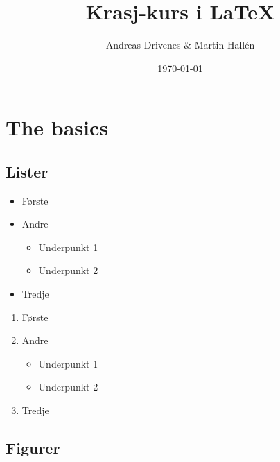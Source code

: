 \documentclass[a4paper]{article}
\begin{document}
\title{Krasj-kurs i \LaTeX}
\author{Andreas Drivenes \& Martin Hallén}
\date{\today}

\maketitle

\begin{abstract}
    \blindtext
\end{abstract}

\section{The basics}

\blindtext

\subsection{Lister}

\begin{itemize}
    \item Første
    \item Andre
    \begin{itemize}
        \item Underpunkt 1
        \item Underpunkt 2
    \end{itemize}
    \item Tredje
\end{itemize}

\begin{enumerate}
    \item Første
    \item Andre
    \begin{itemize}
        \item Underpunkt 1
        \item Underpunkt 2
    \end{itemize}
    \item Tredje
\end{enumerate}

\subsection{Figurer}

\end{document}

